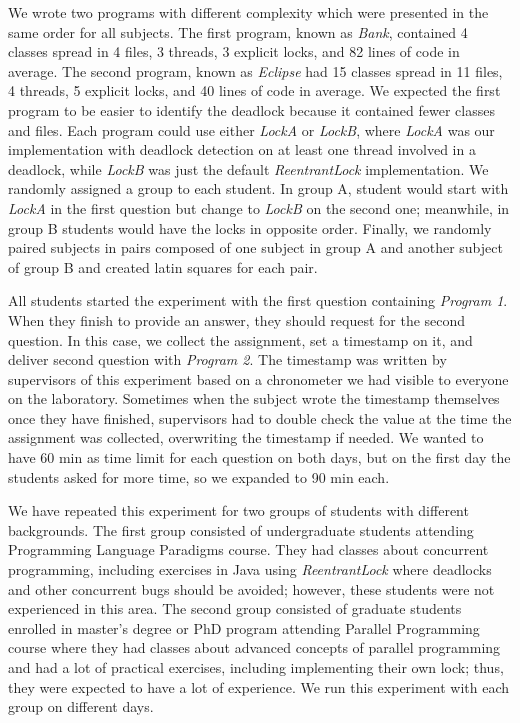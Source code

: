 We wrote two programs with different complexity which were presented in the same order for all subjects. The first program, known as \emph{Bank}, contained 4 classes spread in 4 files, 3 threads, 3 explicit locks, and 82 lines of code in average. The second program, known as \emph{Eclipse} had 15 classes spread in 11 files, 4 threads, 5 explicit locks, and 40 lines of code in average. We expected the first program to be easier to identify the deadlock because it contained fewer classes and files. Each program could use either \emph{LockA} or \emph{LockB}, where \emph{LockA} was our implementation with deadlock detection on at least one thread involved in a deadlock, while \emph{LockB} was just the default \emph{ReentrantLock} implementation. We randomly assigned a group to each student. In group A, student would start with \emph{LockA} in the first question but change to \emph{LockB} on the second one; meanwhile, in group B students would have the locks in opposite order. Finally, we randomly paired subjects in pairs composed of one subject in group A and another subject of group B and created latin squares for each pair.

All students started the experiment with the first question containing \emph{Program 1}. When they finish to provide an answer, they should request for the second question. In this case, we collect the assignment, set a timestamp on it, and deliver second question with \emph{Program 2}. The timestamp was written by supervisors of this experiment based on a chronometer we had visible to everyone on the laboratory. Sometimes when the subject wrote the timestamp themselves once they have finished, supervisors had to double check the value at the time the assignment was collected, overwriting the timestamp if needed. We wanted to have 60 min as time limit for each question on both days, but on the first day the students asked for more time, so we expanded to 90 min each. 

We have repeated this experiment for two groups of students with different backgrounds. The first group consisted of undergraduate students attending Programming Language Paradigms course. They had classes about concurrent programming, including exercises in Java using \emph{ReentrantLock} where deadlocks and other concurrent bugs should be avoided; however, these students were not experienced in this area. The second group consisted of graduate students enrolled in master's degree or PhD program attending Parallel Programming course where they had classes about advanced concepts of parallel programming and had a lot of practical exercises, including implementing their own lock; thus, they were expected to have a lot of experience. We run this experiment with each group on different days.


